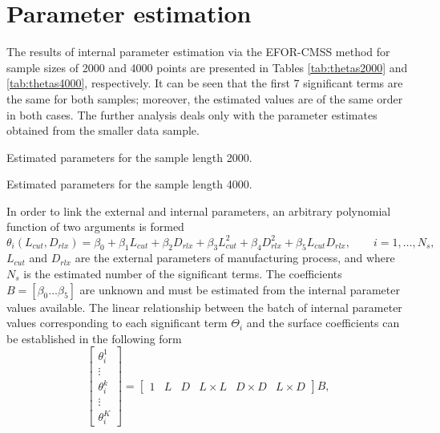 \documentclass[a4paper,11pt,twoside]{article}
\theoremstyle{mytheoremstyle}
\begin{document}
\section{Parameter estimation}
\par The results of internal parameter estimation via the EFOR-CMSS method for sample sizes of 2000 and 4000 points are presented in Tables \ref{tab:thetas2000} and \ref{tab:thetas4000}, respectively. It can be seen that the first 7 significant terms are the same for both samples; moreover, the estimated values are of the same order in both cases. The further analysis deals only with the parameter estimates obtained from the smaller data sample. 
\begin{table}[!h]
	\centering
	\caption{Estimated parameters for the sample length 2000.}\label{tab:thetas2000}
	\small
	
\end{table}
\begin{table}[!h]
	\centering
	\caption{Estimated parameters for the sample length 4000.}\label{tab:thetas4000}
	\small
	
\end{table}
\par In order to link the external and internal parameters, an arbitrary polynomial function of two arguments is formed
\begin{equation}
\theta_i(L_{cut},D_{rlx}) = \beta_0 + \beta_1 L_{cut} + \beta_2 D_{rlx} + \beta_3 L_{cut}^{2} + \beta_4 D_{rlx}^{2} + \beta_5 L_{cut} D_{rlx}, \qquad i=1,\dots,N_s,
\end{equation}
$L_{cut}$ and $D_{rlx}$ are the external parameters of manufacturing process, and where $N_s$ is the estimated number of the significant terms. The coefficients $B = \left[ \beta_0 \dots \beta_5 \right]$ are unknown and must be estimated from the internal parameter values available. The linear relationship between the batch of internal parameter values corresponding to each significant term $\Theta_i$ and the surface coefficients can be established in the following form
\begin{equation}\label{eq:linrel}
\left[\begin{array}{c}
\theta_{i}^{1} \\
\vdots \\
\theta_{i}^{k} \\
\vdots \\
\theta_{i}^{K}
\end{array}\right] =
\left[\begin{array}{cccccc}
1 & L& D& L\times L& D\times D& L\times D
\end{array}\right] B,
\end{equation}
\end{document}
